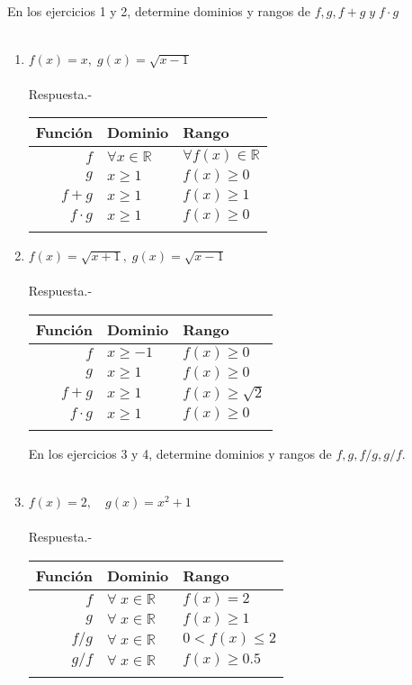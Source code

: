 En los ejercicios 1 y 2, determine dominios y rangos de $f,g,f+g \; y \; f\cdot g$\\\\
\begin{enumerate}

\item $f(x)=x, \; g(x)=\sqrt{x-1}$\\\\
    Respuesta.-\; 
    \begin{center}
	\begin{tabular}{r l l}
	    Función&Dominio&Rango\\ 
	    \hline 
	    $f$ & $\forall x \in \mathbb{R}$ & $\forall f(x) \in \mathbb{R}$\\
	    $g$ & $x\geq 1$ & $f(x) \geq 0$\\
	    $f+g$ & $x\geq 1$ & $f(x)\geq 1$\\
	    $f\cdot g$ & $x\geq 1$ & $f(x) \geq 0$\\\\
	\end{tabular}
    \end{center}

\item $f(x)=\sqrt{x+1}, \; g(x)=\sqrt{x-1}$\\\\
    Respuesta.-\;
    \begin{center}
	\begin{tabular}{r l l}
	    Función&Dominio&Rango\\ 
	    \hline
	    $f$ & $x\geq -1$ & $f(x) \geq 0$\\
	    $g$ & $x\geq 1$ & $f(x) \geq 0$\\
	    $f+g$ & $x \geq 1$ & $f(x) \geq \sqrt{2}$\\
	    $f\cdot g$ & $x\geq 1$ & $f(x)\geq 0$\\\\
	\end{tabular}
    \end{center}

En los ejercicios 3 y 4, determine dominios y rangos de $f,g,f/g,g/f$.\\\\

\item $f(x)=2, \quad g(x)=x^2+1$\\\\
    Respuesta.-\; 
    \begin{center}
	\begin{tabular}{r l l}
	    Función&Dominio&Rango\\ 
	    \hline
	    $f$&$\forall\; x \in \mathbb{R}$&$f(x)=2$\\
	    $g$&$\forall \; x \in \mathbb{R}$&$f(x)\geq 1$\\
	    $f/g$&$\forall \; x \in \mathbb{R}$&$0<f(x)\leq 2$\\
	    $g/f$&$\forall \; x \in \mathbb{R}$&$f(x) \geq 0.5$\\\\
	\end{tabular}
    \end{center}


\end{enumerate}
